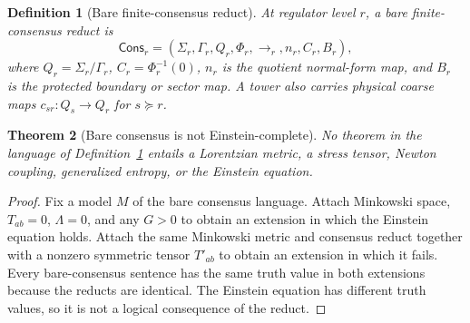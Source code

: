 \documentclass[11pt]{article}
\newtheorem{theorem}{Theorem}[section]
\newtheorem{definition}[theorem]{Definition}
\begin{document}
\begin{definition}[Bare finite-consensus reduct]
\label{def:compact-bare-finite-consensus-reduct}
At regulator level \(r\), a bare finite-consensus reduct is
\[
\mathsf{Cons}_r=
(\Sigma_r,\Gamma_r,Q_r,\Phi_r,\to_r,n_r,C_r,B_r),
\]
where \(Q_r=\Sigma_r/\Gamma_r\), \(C_r=\Phi_r^{-1}(0)\), \(n_r\) is the
quotient normal-form map, and \(B_r\) is the protected boundary or sector
map. A tower also carries physical coarse maps \(c_{sr}:Q_s\to Q_r\) for
\(s\succeq r\).
\end{definition}

\begin{theorem}[Bare consensus is not Einstein-complete]
\label{thm:compact-bare-consensus-not-einstein-complete}
No theorem in the language of
Definition~\ref{def:compact-bare-finite-consensus-reduct} entails a
Lorentzian metric, a stress tensor, Newton coupling, generalized entropy, or
the Einstein equation.
\end{theorem}

\begin{proof}
Fix a model \(M\) of the bare consensus language. Attach Minkowski space,
\(T_{ab}=0\), \(\Lambda=0\), and any \(G>0\) to obtain an extension in which
the Einstein equation holds. Attach the same Minkowski metric and consensus
reduct together with a nonzero symmetric tensor \(T'_{ab}\) to obtain an
extension in which it fails. Every bare-consensus sentence has the same truth
value in both extensions because the reducts are identical. The Einstein
equation has different truth values, so it is not a logical consequence of
the reduct.
\end{proof}
\end{document}
